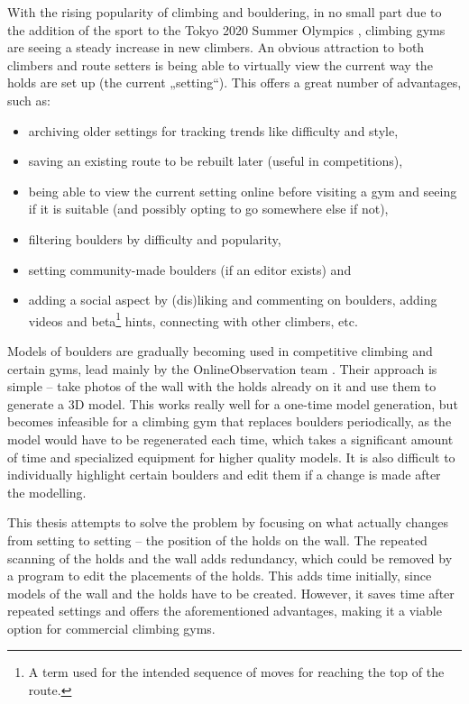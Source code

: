
With the rising popularity of climbing and bouldering, in no small part due to the addition of the sport to the Tokyo 2020 Summer Olympics \cite{olympics}, climbing gyms are seeing a steady increase in new climbers.
An obvious attraction to both climbers and route setters is being able to virtually view the current way the holds are set up (the current „setting“).
This offers a great number of advantages, such as:

\begin{itemize}
	\item archiving older settings for tracking trends like difficulty and style,
	\item saving an existing route to be rebuilt later (useful in competitions),
	\item being able to view the current setting online before visiting a gym and seeing if it is suitable (and possibly opting to go somewhere else if not),
	\item filtering boulders by difficulty and popularity,
	\item setting community-made boulders (if an editor exists) and
	\item adding a social aspect by (dis)liking and commenting on boulders, adding videos and beta\footnote{A term used for the intended sequence of moves for reaching the top of the route.} hints, connecting with other climbers, etc.
\end{itemize}

Models of boulders are gradually becoming used in competitive climbing and certain gyms, lead mainly by the OnlineObservation team \cite{onlineobservation}.
Their approach is simple -- take photos of the wall with the holds already on it and use them to generate a 3D model.
This works really well for a one-time model generation, but becomes infeasible for a climbing gym that replaces boulders periodically, as the model would have to be regenerated each time, which takes a significant amount of time and specialized equipment for higher quality models.
It is also difficult to individually highlight certain boulders and edit them if a change is made after the modelling.

This thesis attempts to solve the problem by focusing on what actually changes from setting to setting -- the position of the holds on the wall.
The repeated scanning of the holds and the wall adds redundancy, which could be removed by a program to edit the placements of the holds.
This adds time initially, since models of the wall and the holds have to be created.
However, it saves time after repeated settings and offers the aforementioned advantages, making it a viable option for commercial climbing gyms.

